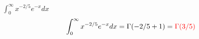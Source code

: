 \item [10.] $\int_0^\infty x^{-2/5}e^{-x}dx$
\[
    \int_0^\infty x^{-2/5}e^{-x}dx = \Gamma(-2/5+1)=\textcolor{red}{\Gamma(3/5)}
\]